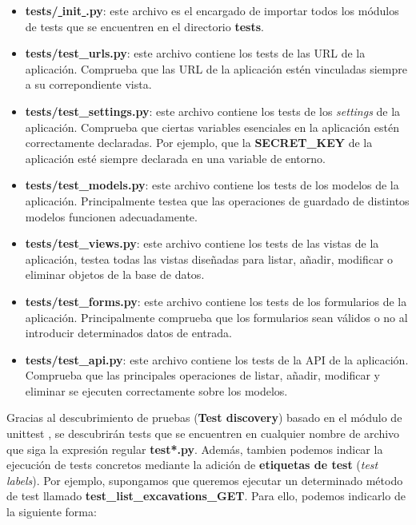     \begin{itemize}
        \item \textbf{tests/\underline{  }init\underline{  }.py}: este archivo es el
        encargado de importar todos los módulos de tests que se encuentren en el
        directorio \textbf{tests}.
        \item \textbf{tests/test\_urls.py}: este archivo contiene los tests de las URL de la
        aplicación. Comprueba que las URL de la aplicación estén vinculadas siempre a su
        correpondiente vista.
        \item \textbf{tests/test\_settings.py}: este archivo contiene los tests de los
        \textit{settings} de la aplicación. Comprueba que ciertas variables esenciales en
        la aplicación estén correctamente declaradas. Por ejemplo, que la
        \textbf{SECRET\_KEY} de la aplicación esté siempre declarada en una variable de
        entorno.
        \item \textbf{tests/test\_models.py}: este archivo contiene los tests de los modelos
        de la aplicación. Principalmente testea que las operaciones de guardado de distintos
        modelos funcionen adecuadamente.
        \item \textbf{tests/test\_views.py}: este archivo contiene los tests de las vistas
        de la aplicación, testea todas las vistas diseñadas para listar, añadir, modificar o
        eliminar objetos de la base de datos.
        \item \textbf{tests/test\_forms.py}: este archivo contiene los tests de los formularios
        de la aplicación. Principalmente comprueba que los formularios sean válidos o no
        al introducir determinados datos de entrada.
        \item \textbf{tests/test\_api.py}: este archivo contiene los tests de la API de la
        aplicación. Comprueba que las principales operaciones de listar, añadir, modificar y
        eliminar se ejecuten correctamente sobre los modelos.
    \end{itemize}

Gracias al descubrimiento de pruebas (\textbf{Test discovery}) basado en el módulo de
unittest \cite{test-discovery}, se descubrirán tests que se encuentren en cualquier nombre
de archivo que siga la expresión regular \textbf{test*.py}. Además, tambien podemos indicar
la ejecución de tests concretos mediante la adición de \textbf{etiquetas de test}
(\textit{test labels}). Por ejemplo, supongamos que queremos ejecutar un determinado método
de test llamado \textbf{test\_list\_excavations\_GET}. Para ello, podemos indicarlo de la
siguiente forma:


